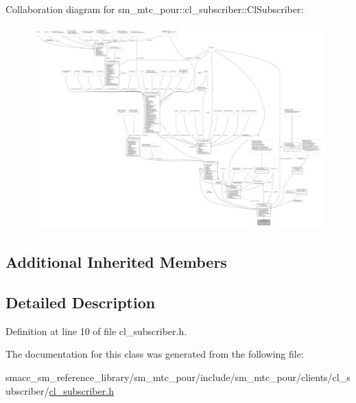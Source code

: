 Collaboration diagram for sm\+\_\+mtc\+\_\+pour\+:\+:cl\+\_\+subscriber\+:\+:Cl\+Subscriber\+:
\nopagebreak
\begin{figure}[H]
\begin{center}
\leavevmode
\includegraphics[width=350pt]{classsm__mtc__pour_1_1cl__subscriber_1_1ClSubscriber__coll__graph}
\end{center}
\end{figure}
\subsection*{Additional Inherited Members}


\subsection{Detailed Description}


Definition at line 10 of file cl\+\_\+subscriber.\+h.



The documentation for this class was generated from the following file\+:\begin{DoxyCompactItemize}
\item 
smacc\+\_\+sm\+\_\+reference\+\_\+library/sm\+\_\+mtc\+\_\+pour/include/sm\+\_\+mtc\+\_\+pour/clients/cl\+\_\+subscriber/\hyperlink{sm__mtc__pour_2include_2sm__mtc__pour_2clients_2cl__subscriber_2cl__subscriber_8h}{cl\+\_\+subscriber.\+h}\end{DoxyCompactItemize}
